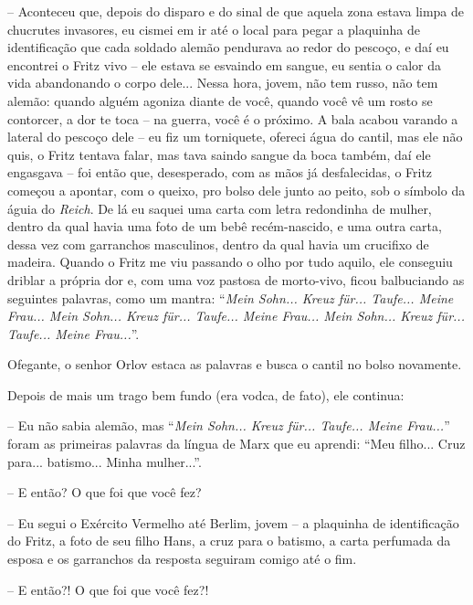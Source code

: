 -- Aconteceu que, depois do disparo e do sinal de que aquela zona estava
limpa de chucrutes invasores, eu cismei em ir até o local para pegar a
plaquinha de identificação que cada soldado alemão pendurava ao redor do
pescoço, e daí eu encontrei o Fritz vivo -- ele estava se esvaindo em
sangue, eu sentia o calor da vida abandonando o corpo dele... Nessa
hora, jovem, não tem russo, não tem alemão: quando alguém agoniza diante
de você, quando você vê um rosto se contorcer, a dor te toca -- na
guerra, você é o próximo. A bala acabou varando a lateral do pescoço
dele -- eu fiz um torniquete, ofereci água do cantil, mas ele não quis,
o Fritz tentava falar, mas tava saindo sangue da boca também, daí ele
engasgava -- foi então que, desesperado, com as mãos já desfalecidas, o
Fritz começou a apontar, com o queixo, pro bolso dele junto ao peito,
sob o símbolo da águia do \emph{Reich}. De lá eu saquei uma carta com
letra redondinha de mulher, dentro da qual havia uma foto de um bebê
recém-nascido, e uma outra carta, dessa vez com garranchos masculinos,
dentro da qual havia um crucifixo de madeira. Quando o Fritz me viu
passando o olho por tudo aquilo, ele conseguiu driblar a própria dor e,
com uma voz pastosa de morto-vivo, ficou balbuciando as seguintes
palavras, como um mantra: ``\emph{Mein Sohn... Kreuz für... Taufe...
Meine Frau... Mein Sohn... Kreuz für... Taufe... Meine Frau... Mein
Sohn... Kreuz für... Taufe... Meine Frau...}''.

Ofegante, o senhor Orlov estaca as palavras e busca o cantil no bolso
novamente.

Depois de mais um trago bem fundo (era vodca, de fato), ele continua:

-- Eu não sabia alemão, mas ``\emph{Mein Sohn... Kreuz für... Taufe...
Meine Frau...}'' foram as primeiras palavras da língua de Marx que eu
aprendi: ``Meu filho... Cruz para... batismo... Minha mulher...''.

-- E então? O que foi que você fez?

-- Eu segui o Exército Vermelho até Berlim, jovem -- a plaquinha de
identificação do Fritz, a foto de seu filho Hans, a cruz para o batismo,
a carta perfumada da esposa e os garranchos da resposta seguiram comigo
até o fim.

-- E então?! O que foi que você fez?!

